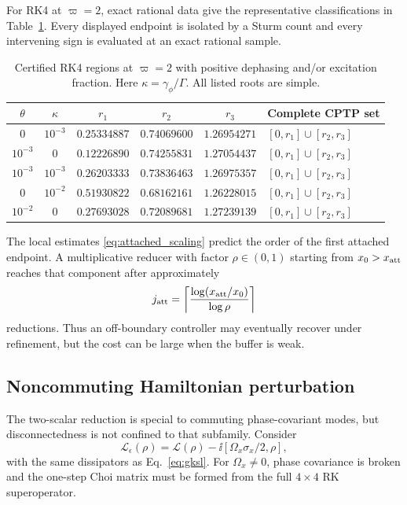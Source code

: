 For RK4 at $\varpi=2$, exact rational data give the representative classifications in Table~\ref{tab:robust_cases}. Every displayed endpoint is isolated by a Sturm count and every intervening sign is evaluated at an exact rational sample.

\begin{table}[t]
\centering
\caption{Certified RK4 regions at $\varpi=2$ with positive dephasing and/or excitation fraction. Here $\kappa=\gamma_\phi/\Gamma$. All listed roots are simple.}
\label{tab:robust_cases}
\small
\begingroup
\setlength{\tabcolsep}{9pt}
\renewcommand{\arraystretch}{1.10}
\begin{tabular}{@{}ccccc l@{}}
\toprule
$\theta$ & $\kappa$ & $r_1$ & $r_2$ & $r_3$ & Complete CPTP set \\
\midrule
$0$ & $10^{-3}$ & $0.25334887$ & $0.74069600$ & $1.26954271$ & $[0,r_1]\cup[r_2,r_3]$ \\
$10^{-3}$ & $0$ & $0.12226890$ & $0.74255831$ & $1.27054437$ & $[0,r_1]\cup[r_2,r_3]$ \\
$10^{-3}$ & $10^{-3}$ & $0.26203333$ & $0.73836463$ & $1.26975357$ & $[0,r_1]\cup[r_2,r_3]$ \\
$0$ & $10^{-2}$ & $0.51930822$ & $0.68162161$ & $1.26228015$ & $[0,r_1]\cup[r_2,r_3]$ \\
$10^{-2}$ & $0$ & $0.27693028$ & $0.72089681$ & $1.27239139$ & $[0,r_1]\cup[r_2,r_3]$ \\
\bottomrule
\end{tabular}
\endgroup
\end{table}

The local estimates \eqref{eq:attached_scaling} predict the order of the first attached endpoint. A multiplicative reducer with factor $\rho\in(0,1)$ starting from $x_0>x_{\rm att}$ reaches that component after approximately
\begin{equation}
 j_{\rm att}=\left\lceil\frac{\log(x_{\rm att}/x_0)}{\log\rho}\right\rceil
 \label{eq:attached_reductions}
\end{equation}
reductions. Thus an off-boundary controller may eventually recover under refinement, but the cost can be large when the buffer is weak.

\subsection{Noncommuting Hamiltonian perturbation}

The two-scalar reduction is special to commuting phase-covariant modes, but disconnectedness is not confined to that subfamily. Consider
\begin{equation}
 \mathcal L_{\epsilon}(\rho)=\mathcal L(\rho)-\ii[\Omega_x\sigma_x/2,\rho],
 \label{eq:transverse_generator}
\end{equation}
with the same dissipators as Eq.~\eqref{eq:gksl}. For $\Omega_x\ne0$, phase covariance is broken and the one-step Choi matrix must be formed from the full $4\times4$ RK superoperator.


